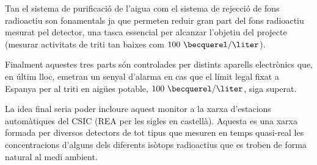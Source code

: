 Tan el sistema de purificació de l'aigua com el sistema de rejecció de fons radioactiu son fonamentals ja que permeten reduir gran part del fons radioactiu mesurat pel detector, una tasca essencial per alcanzar l'objetiu del projecte (mesurar activitats de triti tan baixes com $100~\becquerel/\liter$).

Finalment aquestes tres parts són controlades per distints aparells electrònics que, en últim lloc, emetran un senyal d'alarma en cas que el límit legal fixat a Espanya per al triti en aigües potable, $100~\becquerel/\liter$, siga superat.

La idea final seria poder incloure aquest monitor a la xarxa d'estacions automàtiques del CSIC\cite{REA} (REA per les sigles en castellà). Aquesta es una xarxa formada per diversos detectors de tot tipus que mesuren en temps quasi-real les concentracions d'alguns dels diferents isòtops radioactius que es troben de forma natural al medi ambient. 